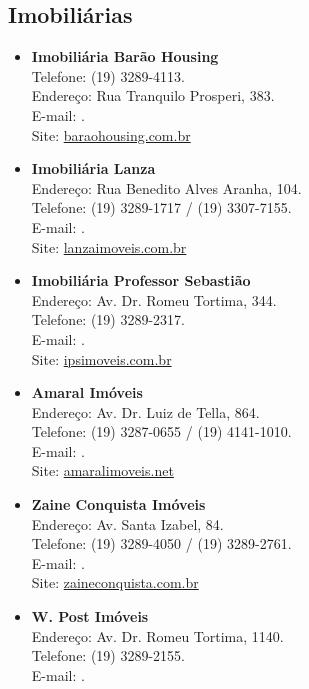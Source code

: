 \subsection{Imobiliárias}

\begin{itemize}
\item   \textbf{Imobiliária Barão Housing}
        \\Telefone: (19) 3289-4113.
        \\Endereço: Rua Tranquilo Prosperi, 383.
        \\E-mail: .
        \\Site: \url{baraohousing.com.br}

\item   \textbf{Imobiliária Lanza}
		\\Endereço: Rua Benedito Alves Aranha, 104.
		\\Telefone: (19) 3289-1717 / (19) 3307-7155.
		\\E-mail: .
		\\Site: \url{lanzaimoveis.com.br}

\item   \textbf{Imobiliária Professor Sebastião}
		\\Endereço: Av. Dr. Romeu Tortima, 344.
		\\Telefone: (19) 3289-2317.
		\\E-mail: .
		\\Site: \url{ipsimoveis.com.br}

\item   \textbf{Amaral Imóveis}
		\\Endereço: Av. Dr. Luiz de Tella, 864.
		\\Telefone: (19) 3287-0655 / (19) 4141-1010.
		\\E-mail: .
		\\Site: \url{amaralimoveis.net}

\item   \textbf{Zaine Conquista Imóveis}
		\\Endereço: Av. Santa Izabel, 84.
		\\Telefone: (19) 3289-4050 / (19) 3289-2761.
		\\E-mail: .
		\\Site: \url{zaineconquista.com.br}

\item   \textbf{W. Post Imóveis}
		\\Endereço: Av. Dr. Romeu Tortima, 1140.
		\\Telefone: (19) 3289-2155.
		\\E-mail: .


\end{itemize}
